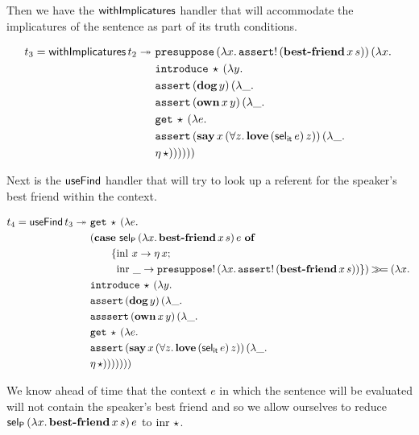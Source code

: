 Then we have the $\mathsf{withImplicatures}$ handler that will accommodate the
implicatures of the sentence as part of its truth conditions.

\begin{align*}
  t_3 = \ap{\withImplicatures}{t_2} \tto \ 
  &\app{\op{presuppose}}{(\lam{x}{\ap{\op{assert}!}{(\app{\obj{best-friend}}{x}{s})}})}{(\lam{x}{ \\
  &\app{\op{introduce}}{\star}{(\lam{y}{ \\
  &\app{\op{assert}}{(\ap{\obj{dog}}{y})}{(\lam{\_}{ \\
  &\app{\op{assert}}{(\app{\obj{own}}{x}{y})}{(\lam{\_}{ \\
  &\app{\op{get}}{\star}{(\lam{e}{ \\
  &\app{\op{assert}}{(\app{\obj{say}}{x}{(\forall z.\, \app{\obj{love}}{(\ap{\selit}{e})}{z})})}{(\lam{\_}{ \\
  &\etaE{\star}})}})}})}})}})}})}
\end{align*}

Next is the $\mathsf{useFind}$ handler that will try to look up a referent for the
speaker's best friend within the context.

\begin{align*}
  t_4 = \mathsf{useFind}\,t_3 \twoheadrightarrow \
  &\mathtt{get}\,\star\,(\lambda e.\,  \\
  &(\text{\textbf{case} $\mathsf{sel}_{\mathsf{P}}\,(\lambda x.\, \textbf{best-friend}\,x\,s)\,e$ \textbf{of}} \\ &\qquad \{\operatorname{inl}\,x \to \eta\,x; \\ &\qquad \ \operatorname{inr}\,\_ \to \mathtt{presuppose}!\,(\lambda x.\, \mathtt{assert}!\,(\textbf{best-friend}\,x\,s)) \}) \mathbin{\gg\!=} (\lambda x.\,  \\
  &\mathtt{introduce}\,\star\,(\lambda y.\,  \\
  &\mathtt{assert}\,(\textbf{dog}\,y)\,(\lambda \_.\,  \\
  &\mathtt{asssert}\,(\textbf{own}\,x\,y)\,(\lambda \_.\,  \\
  &\mathtt{get}\,\star\,(\lambda e.\,  \\
  &\mathtt{assert}\,(\textbf{say}\,x\,(\forall z.\, \textbf{love}\,(\mathsf{sel}_{\mathsf{it}}\,e)\,z))\,(\lambda \_.\,  \\
  &\eta\,\star)))))))
\end{align*}

We know ahead of time that the context $e$ in which the sentence will be
evaluated will not contain the speaker's best friend and so we allow
ourselves to reduce
$\mathsf{sel}_{\mathsf{P}}\,(\lambda x.\, \textbf{best-friend}\,x\,s)\,e$ to
$\operatorname{inr}\,\star$.

